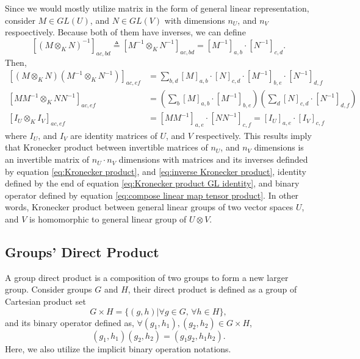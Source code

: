 \documentclass[preprint, 12pt]{revtex4-2}
\numberwithin{equation}{section}
\begin{document}
Since we would mostly utilize matrix in the form of general linear representation, consider $M\in GL(U)$, and $N\in GL(V)$ with dimensions $n_U$, and $n_V$ respoectively. Because both of them have inverses, we can define
\begin{equation}\label{eq:inverse Kronecker product}
    \left[(M\otimes_KN)^{-1}\right]_{ac,bd} \triangleq \left[M^{-1}\otimes_KN^{-1}\right]_{ac,bd} = \left[M^{-1}\right]_{a,b}\cdot\left[N^{-1}\right]_{c,d}.
\end{equation}
Then,
\begin{equation}\label{eq:Kronecker product GL identity}
    \begin{aligned}
        \left[(M\otimes_KN)(M^{-1}\otimes_KN^{-1})\right]_{ac,ef} &= \sum_{b,d}\left[M\right]_{a,b}\cdot\left[N\right]_{c,d}\cdot\left[M^{-1}\right]_{b,e}\cdot\left[N^{-1}\right]_{d,f} \\
        \left[MM^{-1}\otimes_KNN^{-1}\right]_{ac,ef} &= \left(\sum_{b}\left[M\right]_{a,b}\cdot\left[M^{-1}\right]_{b,e}\right)\left(\sum_{d}\left[N\right]_{c,d}\cdot\left[N^{-1}\right]_{d,f}\right) \\
        \left[I_U\otimes_KI_V\right]_{ac,ef} &= \left[MM^{-1}\right]_{a,e}\cdot\left[NN^{-1}\right]_{c,f} = \left[I_U\right]_{a,e}\cdot\left[I_V\right]_{c,f}
    \end{aligned}
\end{equation}
where $I_U$, and $I_V$ are identity matrices of $U$, and $V$ respectively. This results imply that Kronecker product between invertible matrices of $n_U$, and $n_V$ dimensions is an invertible matrix of $n_U\cdot n_V$ dimensions with matrices and its inverses definded by equation \ref{eq:Kronecker product}, and \ref{eq:inverse Kronecker product}, identity defined by the end of equation \ref{eq:Kronecker product GL identity}, and binary operator defined by equation \ref{eq:compose linear map tensor product}. In other words, Kronecker product between general linear groups of two vector spaces $U$, and $V$ is homomorphic to general linear group of $U\otimes V$.

\subsection{Groups' Direct Product}
A group direct product is a composition of two groups to form a new larger group. Consider groups $G$ and $H$, their direct product is defined as a group of Cartesian product set
\begin{equation}\label{eq:Cartesian product}
    G\times H = \{(g, h)|\forall g\in G,\, \forall h\in H\},
\end{equation}
and its binary operator defined as, $\forall (g_1, h_1), (g_2, h_2)\in G\times H$,
\begin{equation}\label{eq:direct product binary operator}
    (g_1, h_1)(g_2, h_2) = (g_1g_2, h_1h_2).
\end{equation}
Here, we also utilize the implicit binary operation notations.
\end{document}
